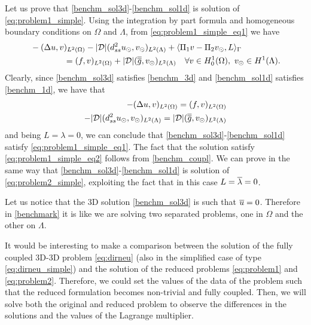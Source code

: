 Let us prove that \eqref{benchm_sol3d}-\eqref{benchm_sol1d} is solution of \eqref{eq:problem1_simple}. Using the integration by part formula and homogeneous boundary conditions on $\Omega$ and $\Lambda$, from \eqref{eq:problem1_simple_eq1} we have
\begin{align*}
&-(\Delta u, v)_{L^2(\Omega)} - |{\cal D}|(d^2_{ss} \ud, \vd)_{L^2(\Lambda)} 
+ \langle \Pi_1 v  - \Pi_2 \vd, L \rangle_\Gamma
\\
\nonumber
&\qquad\qquad= (f,v)_{L^2(\Omega)} + |{\cal D}| (\avrd{g},\vd)_{L^2(\Lambda)}
\quad \forall v \in H^1_0(\Omega), \ \vd \in H^1(\Lambda).
\\
\end{align*}
Clearly, since \eqref{benchm_sol3d} satisfies \eqref{benchm_3d} and \eqref{benchm_sol1d} satisfies \eqref{benchm_1d}, we have that \begin{align*}
-(\Delta u, v)_{L^2(\Omega)} =  (f,v)_{L^2(\Omega)} \\
-|{\cal D}|(d^2_{ss} \ud, \vd)_{L^2(\Lambda)}  = |{\cal D}| (\avrd{g},\vd)_{L^2(\Lambda)}
\end{align*}
and being $L=\lambda=0$, we can conclude that \eqref{benchm_sol3d}-\eqref{benchm_sol1d} satisfy \eqref{eq:problem1_simple_eq1}. The fact that the solution satisfy \eqref{eq:problem1_simple_eq2} follows from \eqref{benchm_coupl}. We can prove in the same way that \eqref{benchm_sol3d}-\eqref{benchm_sol1d} is solution of \eqref{eq:problem2_simple}, exploiting the fact that in this case $L=\overline{\lambda}=0$. 

\begin{remark}
Let us notice that the 3D solution \eqref{benchm_sol3d} is such that $\overline{u}=0$. Therefore in \eqref{benchmark} it is like we are solving two separated problems, one in $\Omega$ and the other on $\Lambda$.
\end{remark}
\begin{remark}
It would be interesting to make a comparison between the solution of the fully coupled 3D-3D problem \eqref{eq:dirneu} (also in the simplified case of type \eqref{eq:dirneu_simple}) and the solution of the reduced problems \eqref{eq:problem1} and \eqref{eq:problem2}. 
Therefore, we could set the values of the data of the problem such that the reduced formulation becomes non-trivial and fully coupled.
Then, we will solve both the original and reduced problem to observe the differences in the solutions and the values of the Lagrange multiplier.
\end{remark}
